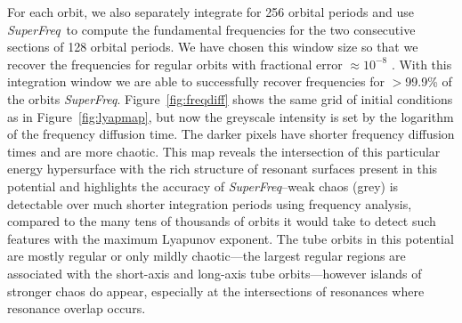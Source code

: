 \documentclass[letterpaper,12pt,preprint]{aastex}
\newcommand{\project}[1]{\textsl{#1}}
\newcommand{\superfreq}{\project{SuperFreq}}
\begin{document}
For each orbit, we also separately integrate for 256 orbital periods and use \superfreq\ to compute the fundamental frequencies for the two consecutive sections of 128 orbital periods. We have chosen this window size so that we recover the frequencies for regular orbits with fractional error $\approx10^{-8}$ \citep[we estimate the error in frequency recovery using the method described in][]{laskar93}. With this integration window we are able to successfully recover frequencies for $>$99.9\% of the orbits \superfreq. Figure~\ref{fig:freqdiff} shows the same grid of initial conditions as in Figure~\ref{fig:lyapmap}, but now the greyscale intensity is set by the logarithm of the frequency diffusion time. The darker pixels have shorter frequency diffusion times and are more chaotic. This map reveals the intersection of this particular energy hypersurface with the rich structure of resonant surfaces present in this potential and highlights the accuracy of \superfreq\---weak chaos (grey) is detectable over much shorter integration periods using frequency analysis, compared to the many tens of thousands of orbits it would take to detect such features with the maximum Lyapunov exponent. The tube orbits in this potential are mostly regular or only mildly chaotic---the largest regular regions are associated with the short-axis and long-axis tube orbits---however islands of stronger chaos do appear, especially at the intersections of resonances where resonance overlap occurs.
\end{document}
